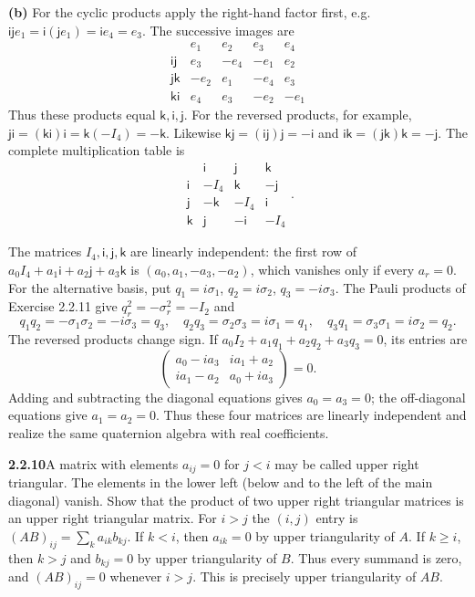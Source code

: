 \textbf{(b)} For the cyclic products apply the right-hand factor first,
e.g.\ $\mathsf i\mathsf je_1=\mathsf i(\mathsf je_1)=\mathsf ie_4=e_3$.
The successive images are
\[
\begin{array}{c|rrrr}
&e_1&e_2&e_3&e_4\\\hline
\mathsf i\mathsf j&e_3&-e_4&-e_1&e_2\\
\mathsf j\mathsf k&-e_2&e_1&-e_4&e_3\\
\mathsf k\mathsf i&e_4&e_3&-e_2&-e_1
\end{array}
\]
Thus these products equal $\mathsf k,\mathsf i,\mathsf j$.
For the reversed products, for example,
$\mathsf j\mathsf i=(\mathsf k\mathsf i)\mathsf i
=\mathsf k(-I_4)=-\mathsf k$.
Likewise $\mathsf k\mathsf j=(\mathsf i\mathsf j)\mathsf j=-\mathsf i$
and $\mathsf i\mathsf k=(\mathsf j\mathsf k)\mathsf k=-\mathsf j$.
The complete multiplication table is
\[
\begin{array}{c|rrr}
&\mathsf i&\mathsf j&\mathsf k\\\hline
\mathsf i&-I_4&\mathsf k&-\mathsf j\\
\mathsf j&-\mathsf k&-I_4&\mathsf i\\
\mathsf k&\mathsf j&-\mathsf i&-I_4
\end{array}.
\]

The matrices $I_4,\mathsf i,\mathsf j,\mathsf k$ are linearly
independent: the first row of
$a_0I_4+a_1\mathsf i+a_2\mathsf j+a_3\mathsf k$ is
$(a_0,a_1,-a_3,-a_2)$, which vanishes only if every $a_r=0$.
For the alternative basis, put $q_1=i\sigma_1$, $q_2=i\sigma_2$,
$q_3=-i\sigma_3$. The Pauli products of Exercise 2.2.11 give
$q_r^2=-\sigma_r^2=-I_2$ and
\[
q_1q_2=-\sigma_1\sigma_2=-i\sigma_3=q_3,\quad
q_2q_3=\sigma_2\sigma_3=i\sigma_1=q_1,\quad
q_3q_1=\sigma_3\sigma_1=i\sigma_2=q_2.
\]
The reversed products change sign. If
$a_0I_2+a_1q_1+a_2q_2+a_3q_3=0$, its entries are
\[
\begin{pmatrix}a_0-ia_3&ia_1+a_2\\ia_1-a_2&a_0+ia_3\end{pmatrix}=0.
\]
Adding and subtracting the diagonal equations gives $a_0=a_3=0$;
the off-diagonal equations give $a_1=a_2=0$. Thus these four
matrices are linearly independent and realize the same quaternion algebra
with real coefficients.

\par\bigskip
\noindent\textbf{2.2.10}\quad A matrix with elements $a_{ij}=0$ for $j<i$ may
be called upper right triangular. The elements in the lower left (below and to
the left of the main diagonal) vanish. Show that the product of two upper
right triangular matrices is an upper right triangular matrix.
\solution
For $i>j$ the $(i,j)$ entry is $(AB)_{ij}=\sum_k a_{ik}b_{kj}$.
If $k<i$, then $a_{ik}=0$ by upper triangularity of $A$.
If $k\ge i$, then $k>j$ and $b_{kj}=0$ by upper triangularity
of $B$. Thus every summand is zero, and $(AB)_{ij}=0$ whenever
$i>j$. This is precisely upper triangularity of $AB$.

